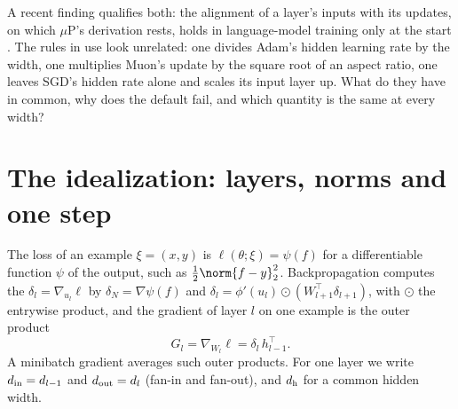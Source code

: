 \begin{refsection}
A recent finding qualifies both: the alignment of a layer's inputs with its updates, on which $\mu$P's derivation rests, holds in language-model training only at the start \parencite{KossonEtAl2026}. The rules in use look unrelated: one divides Adam's hidden learning rate by the width, one multiplies Muon's update by the square root of an aspect ratio, one leaves SGD's hidden rate alone and scales its input layer up. What do they have in common, why does the default fail, and which quantity is the same at every width?

\section{The idealization: layers, norms and one step}\label{sec:modular:ideal}


The loss of an example $\xi=(x,y)$ is $\ell(\theta;\xi)=\psi(f)$ for a differentiable function $\psi$ of the output, such as $\frac12\norm{f-y}_2^2$. Backpropagation computes the  $\delta_l=\nabla_{u_l}\ell$ by $\delta_N=\nabla\psi(f)$ and $\delta_l=\phi'(u_l)\odot(W_{l+1}^\top\delta_{l+1})$, with $\odot$ the entrywise product, and the gradient of layer $l$ on one example is the outer product
\begin{equation}\label{eq:modular:rankone}
  G_l=\nabla_{W_l}\ell=\delta_l\,h_{l-1}^\top .
\end{equation}
A minibatch gradient averages such outer products. For one layer we write $d_{\mathrm{in}}=d_{l-1}$ and $d_{\mathrm{out}}=d_l$ (fan-in and fan-out), and $d_{\mathrm h}$ for a common hidden width.


\end{refsection}
